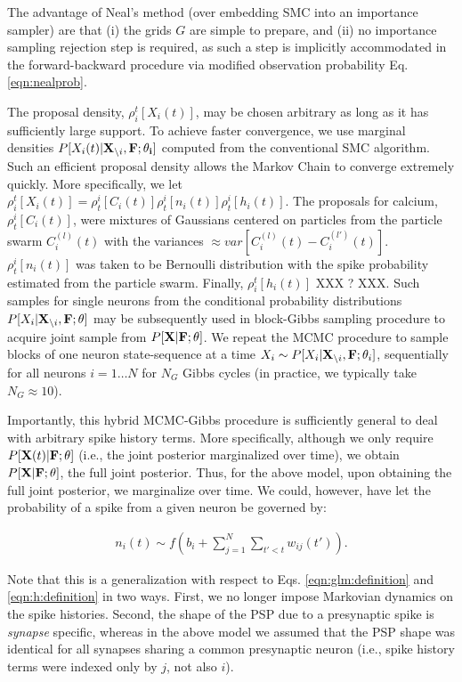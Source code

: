 The advantage of Neal's method (over embedding SMC into an importance sampler) are that (i) the grids $G$ are simple to prepare, and (ii) no importance sampling rejection step is required, as such a  step is implicitly accommodated in the forward-backward procedure via modified observation probability Eq. \eqref{eqn:nealprob}.

The proposal density, $\rho_i^t[X_i(t)]$, may be chosen arbitrary as long as it has sufficiently large support.  To achieve faster convergence, we use marginal densities $P[X_i(t)|{\bf X}_{\backslash i}, \bf F; \mathbf{\theta}_i]$ computed from the conventional SMC algorithm. Such an efficient proposal density allows the Markov Chain to converge extremely quickly.  More specifically, we let $\rho_i^t[X_i(t)] = \rho^i_t[C_i(t)] \rho^i_t[n_i(t)] \rho^i_t[h_i(t)].$  The proposals for calcium, $\rho^i_t[C_i(t)]$, were mixtures of Gaussians centered on particles from the particle swarm $C_i^{(l)}(t)$ with the variances $\approx var\left[C_i^{(l)}(t)-C_i^{(l')}(t) \right]$. $\rho^i_t[n_i(t)]$ was taken to be Bernoulli distribution with the spike probability estimated from the particle swarm. Finally, $\rho_i^t[h_i(t)]$ XXX ? XXX.  Such samples for single neurons from the conditional probability distributions $P[X_i|{\bf X}_{\backslash i}, \bf F; \theta]$ may be subsequently used in block-Gibbs sampling procedure to acquire joint sample from $P[{\bf X}| {\bf F}; \theta]$.  We repeat the MCMC procedure to sample blocks of one neuron state-sequence at a time $X_i\sim P[X_{i}|{\bf X}_{\backslash i},{\bf F}; \mathbf{\theta}_i]$, sequentially for all neurons $i=1\ldots N$ for $N_G$ Gibbs cycles (in practice, we typically take $N_G \approx 10$).  

Importantly, this hybrid MCMC-Gibbs procedure is sufficiently general to deal with arbitrary spike history terms.  More specifically, although we only require $P[{\bf X}(t) | {\bf F}; \mathbf{\theta}]$ (i.e., the joint posterior marginalized over time), we obtain $P[{\bf X} | {\bf F}; \mathbf{\theta}]$, the full joint posterior.  Thus, for the above model, upon obtaining the full joint posterior, we marginalize over time.  We could, however, have let the probability of a spike from a given neuron be governed by:

\begin{align}
n_i(t) \sim f(b_i+\sum_{j=1}^{N}\sum_{t'<t} w_{ij}(t')).
\end{align}

\noindent Note that this is a generalization with respect to Eqs. \eqref{eqn:glm:definition} and \eqref{eqn:h:definition} in two ways.  First, we no longer impose Markovian dynamics on the spike histories.  Second, the shape of the PSP due to a presynaptic spike is \emph{synapse} specific, whereas in the above model we assumed that the PSP shape was identical for all synapses sharing a common presynaptic neuron (i.e., spike history terms were indexed only by $j$, not also $i$).  

